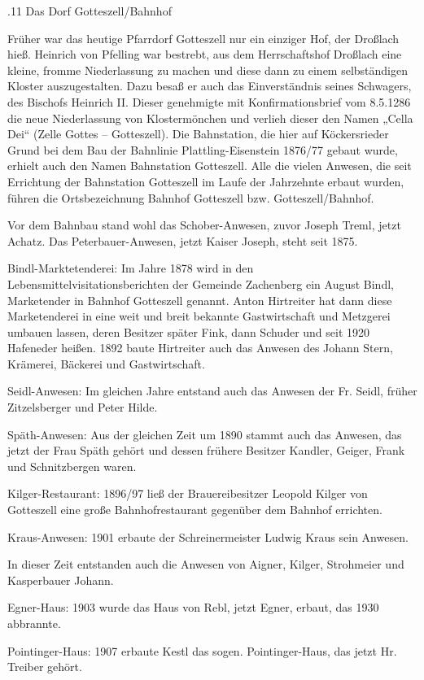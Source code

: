 \documentclass{book}
\begin{document}
.11 Das Dorf Gotteszell/Bahnhof

Früher war das heutige Pfarrdorf Gotteszell nur ein einziger Hof, der Droßlach
hieß. Heinrich von Pfelling war bestrebt, aus dem Herrschaftshof Droßlach eine
kleine, fromme Niederlassung zu machen und diese dann zu einem selbständigen
Kloster auszugestalten. Dazu besaß er auch das Einverständnis seines Schwagers,
des Bischofs Heinrich II. Dieser genehmigte mit Konfirmationsbrief vom 8.5.1286
die neue Niederlassung von Klostermönchen und verlieh dieser den Namen „Cella
Dei“ (Zelle Gottes – Gotteszell). Die Bahnstation, die hier auf Köckersrieder
Grund bei dem Bau der Bahnlinie Plattling-Eisenstein 1876/77 gebaut wurde,
erhielt auch den Namen Bahnstation Gotteszell. Alle die vielen Anwesen, die seit
Errichtung der Bahnstation Gotteszell im Laufe der Jahrzehnte erbaut wurden,
führen die Ortsbezeichnung Bahnhof Gotteszell bzw. Gotteszell/Bahnhof.

Vor dem Bahnbau stand wohl das Schober-Anwesen, zuvor Joseph Treml, jetzt
Achatz. Das Peterbauer-Anwesen, jetzt Kaiser Joseph, steht seit 1875.

Bindl-Marktetenderei: Im Jahre 1878 wird in den Lebensmittelvisitationsberichten
der Gemeinde Zachenberg ein August Bindl, Marketender in Bahnhof Gotteszell
genannt. Anton Hirtreiter hat dann diese Marketenderei in eine weit und breit
bekannte Gastwirtschaft und Metzgerei umbauen lassen, deren Besitzer später
Fink, dann Schuder und seit 1920 Hafeneder heißen. 1892 baute Hirtreiter auch
das Anwesen des Johann Stern, Krämerei, Bäckerei und Gastwirtschaft.

Seidl-Anwesen: Im gleichen Jahre entstand auch das Anwesen der Fr. Seidl, früher
Zitzelsberger und Peter Hilde.

Späth-Anwesen: Aus der gleichen Zeit um 1890 stammt auch das Anwesen, das jetzt
der Frau Späth gehört und dessen frühere Besitzer Kandler, Geiger, Frank und
Schnitzbergen waren.

Kilger-Restaurant: 1896/97 ließ der Brauereibesitzer Leopold Kilger von
Gotteszell eine große Bahnhofrestaurant gegenüber dem Bahnhof errichten.

Kraus-Anwesen: 1901 erbaute der Schreinermeister Ludwig Kraus sein Anwesen.

In dieser Zeit entstanden auch die Anwesen von Aigner, Kilger, Strohmeier und
Kasperbauer Johann.

Egner-Haus: 1903 wurde das Haus von Rebl, jetzt Egner, erbaut, das 1930
abbrannte.

Pointinger-Haus: 1907 erbaute Kestl das sogen. Pointinger-Haus, das jetzt Hr.
Treiber gehört.
\end{document}

